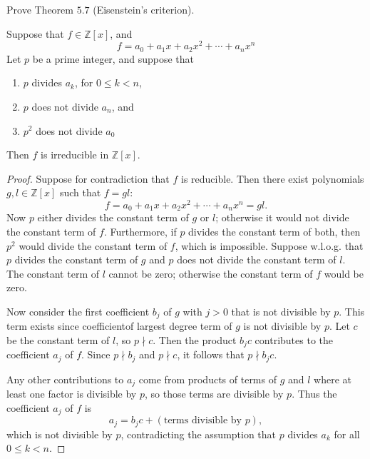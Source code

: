 \begin{tcolorbox}[title=Problem 16, breakable]
    Prove Theorem $5.7$ (Eisenstein's criterion).
\end{tcolorbox}

\begin{theorem}
    Suppose that $f \in \mathbb{Z}[x]$,
        and 
    \[f = a_0 + a_1 x + a_2 x^2 + \cdots +  a_n x^n\]
    Let $p$ be a prime integer, and suppose that
    \begin{enumerate}
        \item $p$ divides $a_k$, for $0 \le k < n$,
        \item $p$ does not divide $a_n$, and 
        \item $p^2$ does not divide $a_0$
    \end{enumerate}
    Then $f$ is irreducible in $\mathbb{Z}[x]$.
\end{theorem}

\begin{proof}
    Suppose for contradiction that $f$ is reducible. Then there exist 
    polynomials $g, l \in \mathbb{Z}[x]$ such that 
    $f = g l$:
    \[
    f = a_0 + a_1 x + a_2 x^2 + \cdots +  a_n x^n = g l.
    \]
    Now $p$ either divides the constant term of $g$ or $l$;
    otherwise it would not divide the constant term of $f$.  
    Furthermore, if $p$ divides the constant term of both, then   
    $p^2$ would divide the constant term of $f$, which is impossible.  
    Suppose w.l.o.g. that $p$ divides the constant term of $g$ 
    and $p$ does not divide the constant term of $l$.  
    The constant term of $l$ cannot be zero; otherwise the constant term of $f$ would be zero.

    Now consider the first coefficient $b_j$ of $g$ with $j>0$ that is 
    not divisible by $p$. This term exists since coefficientof 
    largest degree term of $g$ is not divisible by $p$.
    Let $c$ be the constant term of $l$, so $p \nmid c$. 
    Then the product $b_j c$ contributes to the coefficient $a_j$ of $f$. 
    Since $p \nmid b_j$ and $p \nmid c$, it follows that $p \nmid b_j c$. 

    Any other contributions to $a_j$ come from products of terms of $g$ and $l$ 
        where at least one factor is divisible by $p$, so those terms are divisible by $p$. 
    Thus the coefficient $a_j$ of $f$ is
    \[
    a_j = b_j c + (\text{terms divisible by } p),
    \]
    which is not divisible by $p$, contradicting the assumption that $p$ divides $a_k$ for all $0 \le k < n$.
\end{proof}


